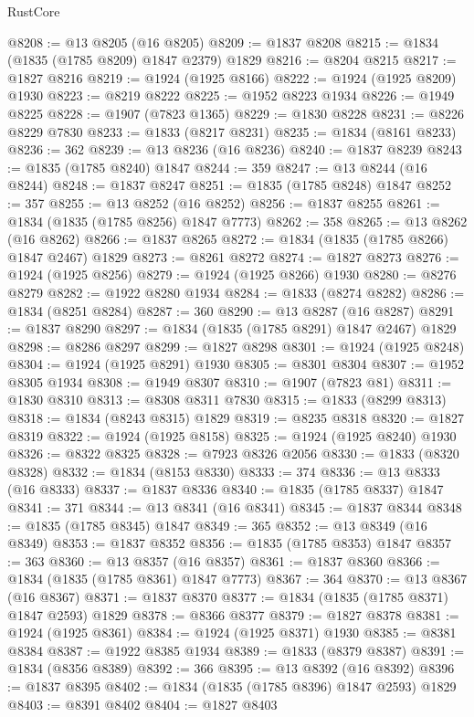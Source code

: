 \begin{lexlean}{RustCore}
\begin{coremodule}
@8208 := @13 @8205 (@16 @8205)
@8209 := @1837 @8208
@8215 := @1834 (@1835 (@1785 @8209) @1847 @2379) @1829
@8216 := @8204 @8215
@8217 := @1827 @8216
@8219 := @1924 (@1925 @8166)
@8222 := @1924 (@1925 @8209) @1930
@8223 := @8219 @8222
@8225 := @1952 @8223 @1934
@8226 := @1949 @8225
@8228 := @1907 (@7823 @1365)
@8229 := @1830 @8228
@8231 := @8226 @8229 @7830
@8233 := @1833 (@8217 @8231)
@8235 := @1834 (@8161 @8233)
@8236 := 362
@8239 := @13 @8236 (@16 @8236)
@8240 := @1837 @8239
@8243 := @1835 (@1785 @8240) @1847
@8244 := 359
@8247 := @13 @8244 (@16 @8244)
@8248 := @1837 @8247
@8251 := @1835 (@1785 @8248) @1847
@8252 := 357
@8255 := @13 @8252 (@16 @8252)
@8256 := @1837 @8255
@8261 := @1834 (@1835 (@1785 @8256) @1847 @7773)
@8262 := 358
@8265 := @13 @8262 (@16 @8262)
@8266 := @1837 @8265
@8272 := @1834 (@1835 (@1785 @8266) @1847 @2467) @1829
@8273 := @8261 @8272
@8274 := @1827 @8273
@8276 := @1924 (@1925 @8256)
@8279 := @1924 (@1925 @8266) @1930
@8280 := @8276 @8279
@8282 := @1922 @8280 @1934
@8284 := @1833 (@8274 @8282)
@8286 := @1834 (@8251 @8284)
@8287 := 360
@8290 := @13 @8287 (@16 @8287)
@8291 := @1837 @8290
@8297 := @1834 (@1835 (@1785 @8291) @1847 @2467) @1829
@8298 := @8286 @8297
@8299 := @1827 @8298
@8301 := @1924 (@1925 @8248)
@8304 := @1924 (@1925 @8291) @1930
@8305 := @8301 @8304
@8307 := @1952 @8305 @1934
@8308 := @1949 @8307
@8310 := @1907 (@7823 @81)
@8311 := @1830 @8310
@8313 := @8308 @8311 @7830
@8315 := @1833 (@8299 @8313)
@8318 := @1834 (@8243 @8315) @1829
@8319 := @8235 @8318
@8320 := @1827 @8319
@8322 := @1924 (@1925 @8158)
@8325 := @1924 (@1925 @8240) @1930
@8326 := @8322 @8325
@8328 := @7923 @8326 @2056
@8330 := @1833 (@8320 @8328)
@8332 := @1834 (@8153 @8330)
@8333 := 374
@8336 := @13 @8333 (@16 @8333)
@8337 := @1837 @8336
@8340 := @1835 (@1785 @8337) @1847
@8341 := 371
@8344 := @13 @8341 (@16 @8341)
@8345 := @1837 @8344
@8348 := @1835 (@1785 @8345) @1847
@8349 := 365
@8352 := @13 @8349 (@16 @8349)
@8353 := @1837 @8352
@8356 := @1835 (@1785 @8353) @1847
@8357 := 363
@8360 := @13 @8357 (@16 @8357)
@8361 := @1837 @8360
@8366 := @1834 (@1835 (@1785 @8361) @1847 @7773)
@8367 := 364
@8370 := @13 @8367 (@16 @8367)
@8371 := @1837 @8370
@8377 := @1834 (@1835 (@1785 @8371) @1847 @2593) @1829
@8378 := @8366 @8377
@8379 := @1827 @8378
@8381 := @1924 (@1925 @8361)
@8384 := @1924 (@1925 @8371) @1930
@8385 := @8381 @8384
@8387 := @1922 @8385 @1934
@8389 := @1833 (@8379 @8387)
@8391 := @1834 (@8356 @8389)
@8392 := 366
@8395 := @13 @8392 (@16 @8392)
@8396 := @1837 @8395
@8402 := @1834 (@1835 (@1785 @8396) @1847 @2593) @1829
@8403 := @8391 @8402
@8404 := @1827 @8403

\end{coremodule}
\end{lexlean}
